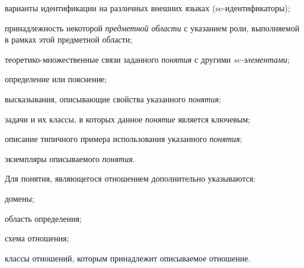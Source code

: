 \begin{SCn}
\begin{scnsubstruct}
{            \begin{scnitemize}
                \item варианты идентификации на различных внешних языках (sc-идентификаторы);
                \item принадлежность некоторой \textit{предметной области} с указанием роли, выполняемой в рамках этой предметной области;
                \item теоретико-множественные связи заданного \textit{понятия} с другими \textit{sc-элементами};
                \item определение или пояснение;
                \item высказывания, описывающие свойства указанного \textit{понятия};
                \item задачи и их классы, в которых данное \textit{понятие} является ключевым;
                \item описание типичного примера использования указанного \textit{понятия};
                \item экземпляры описываемого \textit{понятия}.
            \end{scnitemize}
            Для понятия, являющегося отношением дополнительно указываются:
            \begin{scnitemize}
                \item домены;
                \item область определения;
                \item схема отношения;
                \item классы отношений, которым принадлежит описываемое отношение.
            \end{scnitemize}
        }
\end{scnsubstruct}
\end{SCn}

